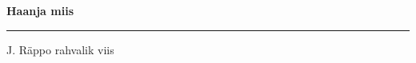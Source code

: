 \documentclass[10pt]{book}
\begin{document}
\pagebreak[3]

{
  \samepage
  \raggedbottom
  \raggedright
  \sloppy


  \vspace{0.2in}

  \noindent\begin{minipage}{.1\textwidth}
    \hfill\vspace{0.1in}
  \end{minipage}%
  \noindent\begin{minipage}{.8\textwidth}
    \centering
    \bfseries
    \large Haanja miis
  \end{minipage}%
  \noindent\begin{minipage}{.1\textwidth}
      \hfill\vspace{0.1in}
  \end{minipage}

  \nopagebreak[4]
  \vspace{0.1in}
  \nopagebreak[4]
  \hrule height 0.05ex
  \nopagebreak[4]
  \vspace{-0.05in}

  {\footnotesize J. R\"appo \hfill rahvalik viis }\\
  \vspace{0.01in}



}
\end{document}
